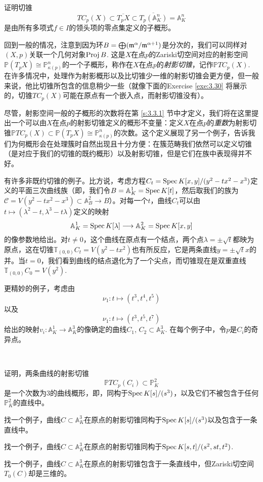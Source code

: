 \begin{exe}\label{exe:3.29}
	证明切锥
	\[
		TC_p(X)\subset \overline{T_pX}\subset \overline{T_p(\mathbb A_K^n)}=\mathbb A_K^n
	\]
	是由所有多项式$f\in I$的领头项的零点集定义的子概形。
\end{exe}

回到一般的情况，注意到因为环$B=\bigoplus (\mathfrak{m}^\alpha/\mathfrak{m}^{\alpha+1})$是分次的，我们可以同样对$(X,p)$关联一个几何对象$\operatorname{Proj} B$. 这是$X$在点$p$的Zariski切空间对应的射影空间$\mathbb P(T_p X)\cong \mathbb P^n_{\kappa(p)}$的一个子概形，称作在$X$在点$p$的\textit{射影切锥}，记作$\mathbb PTC_p(X)$. 在许多情况中，处理作为射影概形以及比切锥少一维的射影切锥会更方便，但一般来说，他比切锥所包含的信息稍少一些（就像下面的Exercise \ref{exe:3.30} 将展示的，切锥$TC_p(X)$可能在原点有一个嵌入点，而射影切锥没有）。

尽管，射影空间一般的子概形的次数将在第 \ref{s:3.3.1} 节中才定义，我们将在这里提出一个可以由$X$在点$p$的射影切锥定义的概形不变量：定义$X$在点$p$的\textit{重数}为射影切锥$\mathbb PTC_p(X)\subset \mathbb P(T_p X)\cong \mathbb P^n_{\kappa(p)}$的次数。这个定义展现了另一个例子，告诉我们为何概形会在处理簇时自然出现且十分方便：在簇范畴我们依然可以定义切锥（是对应于我们的切锥的既约概形）以及射影切锥，但是它们在族中表现得并不好。


有许多非既约切锥的例子。比方说，考虑方程$C_t=\operatorname{Spec} K[x,y]/(y^2-tx^2-x^3)$定义的平面三次曲线族（即，我们令$B=\mathbb A^1_K=\operatorname{Spec} K[t]$，然后取我们的族为$\mathscr C=V(y^2-tx^2-x^3)\subset \mathbb A_B^2\to B$）。对每一个$t$，曲线$C_t$可以由$t\mapsto (\lambda^2-t,\lambda^3-t\lambda)$定义的映射
\[
	\mathbb A_K^1=\operatorname{Spec} K[\lambda]\longrightarrow \mathbb A_K^2=\operatorname{Spec} K[x,y]
\]
的像参数地给出。对$t\neq 0$，这个曲线在原点有一个结点，两个点$\lambda =\pm \sqrt t$都映为原点，这在切锥$\mathbb T_{(0,0)}C_t=V(y^2-tx^2)$也有所反应，它是两条直线$y=\pm \sqrt t x$的并。当$t=0$，我们看到曲线的结点退化为了一个尖点，而切锥现在是双重直线$\mathbb T_{(0,0)}C_0=V(y^2)$.

更精妙的例子，考虑由
\[
	\nu_1:t\longmapsto (t^3,t^4,t^5)
\]
以及
\[
	\nu_1:t\longmapsto (t^3,t^5,t^7)
\]
给出的映射$v_i:\mathbb A_K^1\to \mathbb A_K^3$的像确定的曲线$C_1$, $C_2\subset \mathbb A_K^3$. 在每个例子中，令$p$是$C_i$的奇异点。

\begin{exe}~\label{exe:3.30}
	\begin{compactenum}[(a)]
		\item 证明，两条曲线的射影切锥
		\[
			\mathbb PTC_p(C_i)\subset \mathbb P_K^2
		\]
		是一个次数为$3$的曲线概形，即，同构于$\operatorname{Spec} K[s]/(s^3)$，以及它们不被包含于任何$\mathbb P_K^2$的直线中。
		\item 找一个例子，曲线$C\subset \mathbb A_K^3$在原点的射影切锥同构于$\operatorname{Spec} K[s]/(s^3)$以及包含于一条直线中。
		\item 找一个例子，曲线$C\subset \mathbb A_K^3$在原点的射影切锥同构于$\operatorname{Spec} K[s,t]/(s^2,st,t^2)$.
		\item 找一个例子，曲线$C\subset \mathbb A_K^3$在原点的射影切锥包含于一条直线中，但Zariski切空间$T_0(C)$却是三维的。
	\end{compactenum}
\end{exe}

